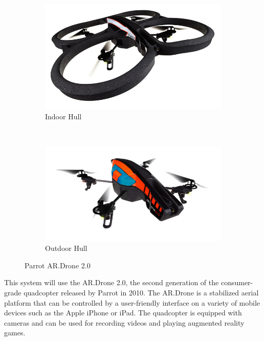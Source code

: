 \begin{figure}
        \centering
        \begin{subfigure}[b]{0.5\textwidth}
                \centering
                \includegraphics[width=\textwidth]{../images/ardrone_indoor.jpg}
                \caption{Indoor Hull}
                \label{fig:indoor}
        \end{subfigure}%
        ~ %
        \begin{subfigure}[b]{0.5\textwidth}
                \centering
                \includegraphics[width=\textwidth]{../images/ardrone_outdoor.jpg}
                \caption{Outdoor Hull}
                \label{fig:outdoor}
        \end{subfigure}
        \caption{Parrot AR.Drone 2.0\cite{ParrotPress}}\label{fig:ardrone}
\end{figure}

This system will use the AR.Drone 2.0, the second generation of the consumer-grade quadcopter released by Parrot in 2010. The AR.Drone is a stabilized aerial platform that can be controlled by a user-friendly interface on a variety of mobile devices such as the Apple iPhone or iPad. The quadcopter is equipped with cameras and can be used for recording videos and playing augmented reality games.

